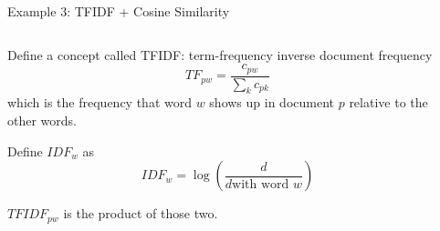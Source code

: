 \documentclass[notes,11pt, aspectratio=169]{beamer}
\newenvironment{wideitemize}{\itemize\addtolength{\itemsep}{10pt}}{\enditemize}
\begin{document}
  \begin{frame}{Example 3: TFIDF + Cosine Similarity}
    \begin{columns}[onlytextwidth, T] %
      \begin{column}{.5\textwidth}
        \begin{wideitemize}
        \item Define a concept called TFIDF: term-frequency inverse document frequency
          \begin{equation}
            TF_{pw} = \frac{c_{pw}}{\sum_{k}c_{pk}}
          \end{equation}
          which is the frequency that word $w$ shows up in document $p$ relative to the other words.
        \item Define $IDF_{w}$ as
          \begin{equation}
            IDF_{w} = \log\left(\frac{d}{d \text{with word } w}\right)
          \end{equation}
        \item $TFIDF_{pw}$ is  the product of those two.
        \end{wideitemize}
      \end{column}%
      \hfill%
      \begin{column}{.5\textwidth}
      \end{column}%
    \end{columns}
  \end{frame}
\end{document}
